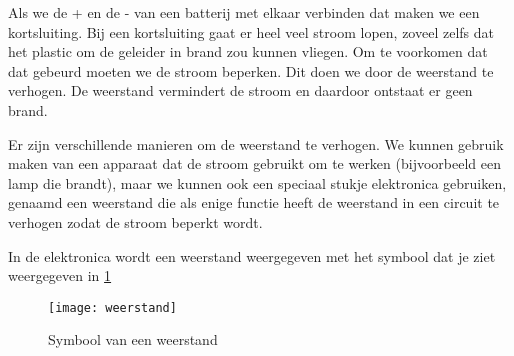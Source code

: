 Als we de + en de - van een batterij met elkaar verbinden dat maken we een kortsluiting. Bij een kortsluiting gaat er heel veel stroom lopen, zoveel zelfs dat het plastic om de geleider in brand zou kunnen vliegen. Om te voorkomen dat dat gebeurd moeten we de stroom beperken. Dit doen we door de weerstand te verhogen. De weerstand vermindert de stroom en daardoor ontstaat er geen brand.

Er zijn verschillende manieren om de weerstand te verhogen. We kunnen gebruik maken van een apparaat dat de stroom gebruikt om te werken (bijvoorbeeld een lamp die brandt), maar we kunnen ook een speciaal stukje elektronica gebruiken, genaamd een weerstand die als enige functie heeft de weerstand in een circuit te verhogen zodat de stroom beperkt wordt.

In de elektronica wordt een weerstand weergegeven met het symbool dat je ziet weergegeven in \ref{symbool:weerstand}

\begin{figure}[h]
\texttt{[image: weerstand]}
\centering
\caption{Symbool van een weerstand}
\label{symbool:weerstand}
\end{figure}

